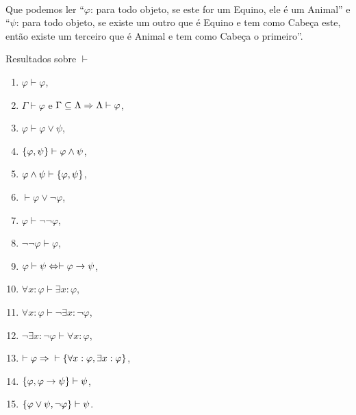         \paragraph{}
            Que podemos ler ``$\varphi$: para todo objeto, se este for um Equino, 
            ele é um Animal'' e ``$\psi$: para todo objeto, se existe um outro 
            que é Equino e tem como Cabeça este, então existe um terceiro que é 
            Animal e tem como Cabeça o primeiro''.
        \begin{proposition}{Resultados sobre $\vdash$}
            \begin{enumerate}[label=\alph*)]
                \item $    {\varphi}\vdash\varphi$,
                \item $\Gamma\vdash\varphi$ e $\Gamma\subseteq\Lambda\Rightarrow \Lambda\vdash\varphi$,
                \item $    {\varphi}\vdash\varphi\lor\psi$,
                \item $\SET{\varphi}{\psi}\vdash\varphi\land\psi$,
                \item $    {\varphi\land\psi}\vdash\SET{\varphi}{\psi}$,
                \item $    \vdash  \varphi\lor\neg\varphi$,
                \item $\varphi\vdash\neg\neg\varphi$,
                \item $\neg\neg\varphi\vdash\varphi$,
                \item $    {\varphi}\vdash\psi\Leftrightarrow\vdash\varphi\rightarrow\psi$,
                \item $    {\forall x:\varphi}\vdash\exists x:\varphi$,
                \item $    {\forall x:\varphi}\vdash\neg\exists x:\neg\varphi$,
                \item $    {\neg\exists x:\neg\varphi}\vdash\forall x:\varphi$,
                \item $\vdash\varphi\RAR{}\vdash\SET{\forall x:\varphi}{\exists x:\varphi}$,
                \item $\SET{\varphi}{\varphi\rar\psi}\vdash\psi$,
                \item $\SET{\varphi\lor\psi}{\neg\varphi}\vdash\psi$.
            \end{enumerate}
        \end{proposition}
